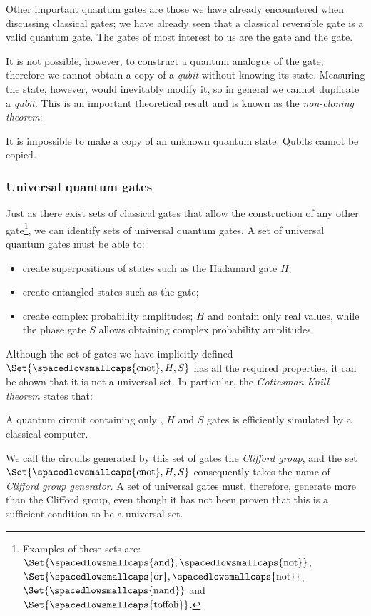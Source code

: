 Other important quantum gates are those we have already encountered when discussing classical gates; we have already seen that a classical reversible gate is a valid quantum gate. The gates of most interest to us are the  gate and the  gate.

It is not possible, however, to construct a quantum analogue of the  gate; therefore we cannot obtain a copy of a \emph{qubit} without knowing its state. Measuring the state, however, would inevitably modify it, so in general we cannot duplicate a \emph{qubit}. This is an important theoretical result and is known as the \emph{non-cloning theorem}:
\begin{theorem}
	It is impossible to make a copy of an unknown quantum state. Qubits cannot be copied.
\end{theorem}

\subsubsection*{Universal quantum gates}
\label{sec:q_gate_univ}
Just as there exist sets of classical gates that allow the construction of any other gate\footnote{Examples of these sets are: $\Set{\text{\spacedlowsmallcaps{and}}, \text{\spacedlowsmallcaps{not}}}$, $\Set{\text{\spacedlowsmallcaps{or}}, \text{\spacedlowsmallcaps{not}}}$, $\Set{\text{\spacedlowsmallcaps{nand}}}$ and $\Set{\text{\spacedlowsmallcaps{toffoli}}}$.}, we can identify sets of universal quantum gates. A set of universal quantum gates must be able to:
\begin{itemize}
	\item create superpositions of states such as the Hadamard gate $H$;
	\item create entangled states such as the  gate;
	\item create complex probability amplitudes; $H$ and  contain only real values, while the phase gate $S$ allows obtaining complex probability amplitudes.
\end{itemize}
Although the set of gates we have implicitly defined $\Set{\text{\spacedlowsmallcaps{cnot}}, H, S}$ has all the required properties, it can be shown that it is not a universal set. In particular, the \emph{Gottesman-Knill theorem} states that:
\begin{theorem}
	A quantum circuit containing only  , $H$ and $S$ gates is efficiently simulated by a classical computer.
\end{theorem}
We call the circuits generated by this set of gates the \emph{Clifford group}, and the set $\Set{ \text{\spacedlowsmallcaps{cnot}}, H, S}$ consequently takes the name of \emph{Clifford group generator}. A set of universal gates must, therefore, generate more than the Clifford group, even though it has not been proven that this is a sufficient condition to be a universal set.

